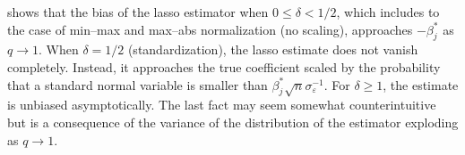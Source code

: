  shows that the bias of the lasso estimator when \(0 \leq \delta < 1/2\), which includes to the case of min--max and max--abs normalization (no scaling), approaches
\(-\beta_j^*\) as \(q \rightarrow 1\). When \(\delta = 1/2\) (standardization), the lasso estimate does not vanish completely. Instead, it approaches the
true coefficient scaled by the probability that a standard normal variable is smaller than \(\beta_j^*\sqrt{n}\sigma_\varepsilon^{-1}\). For \(\delta \geq 1\), the
estimate is unbiased asymptotically. The last fact may seem somewhat counterintuitive but is a consequence of the variance of the distribution of the estimator exploding as \(q \rightarrow 1\).

%
%
